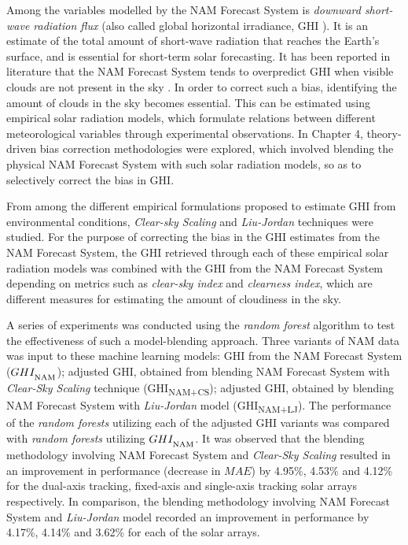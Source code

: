 \par Among the variables modelled by the NAM Forecast System is \textit{downward short-wave radiation flux} (also called global horizontal irradiance, GHI \cite{multimodel_overpredict}). It is an estimate of the total amount of short-wave radiation that reaches the Earth's surface, and is essential for short-term solar forecasting. It has been reported in literature that the NAM Forecast System tends to overpredict GHI when visible clouds are not present in the sky \cite{multimodel_overpredict}. In order to correct such a bias, identifying the amount of clouds in the sky becomes essential. This can be estimated using empirical solar radiation models, which formulate relations between different meteorological variables through experimental observations. In Chapter 4, theory-driven bias correction methodologies were explored, which involved blending the physical NAM Forecast System with such solar radiation models, so as to selectively correct the bias in GHI.

\vspace{0.5cm}
\par From among the different empirical formulations proposed to estimate GHI from environmental conditions, \textit{Clear-sky Scaling} \cite{pvlib_ineichen} and \textit{Liu-Jordan} \cite{pvlib_liujordan2} techniques were studied. For the purpose of correcting the bias in the GHI estimates from the NAM Forecast System, the GHI retrieved through each of these empirical solar radiation models was combined with the GHI from the NAM Forecast System depending on metrics such as \textit{clear-sky index} and \textit{clearness index}, which are different measures for estimating the amount of cloudiness in the sky.

\par A series of experiments was conducted using the \textit{random forest} algorithm to test the effectiveness of such a model-blending approach. Three variants of NAM data was input to these machine learning models: GHI from the NAM Forecast System ($GHI_\textsubscript{NAM}$); adjusted GHI, obtained from blending NAM Forecast System with \textit{Clear-Sky Scaling} technique (GHI\textsubscript{NAM+CS}); adjusted GHI, obtained by blending NAM Forecast System with \textit{Liu-Jordan} model (GHI\textsubscript{NAM+LJ}). The performance of the \textit{random forests} utilizing each of the adjusted GHI variants was compared with \textit{random forests} utilizing $GHI_\textsubscript{NAM}$. It was observed that the blending methodology involving NAM Forecast System and \textit{Clear-Sky Scaling} resulted in an improvement in performance (decrease in $MAE$) by 4.95\%, 4.53\% and 4.12\% for the dual-axis tracking, fixed-axis and single-axis tracking solar arrays respectively. In comparison, the blending methodology involving NAM Forecast System and \textit{Liu-Jordan} model recorded an improvement in performance by 4.17\%, 4.14\% and 3.62\% for each of the solar arrays.

